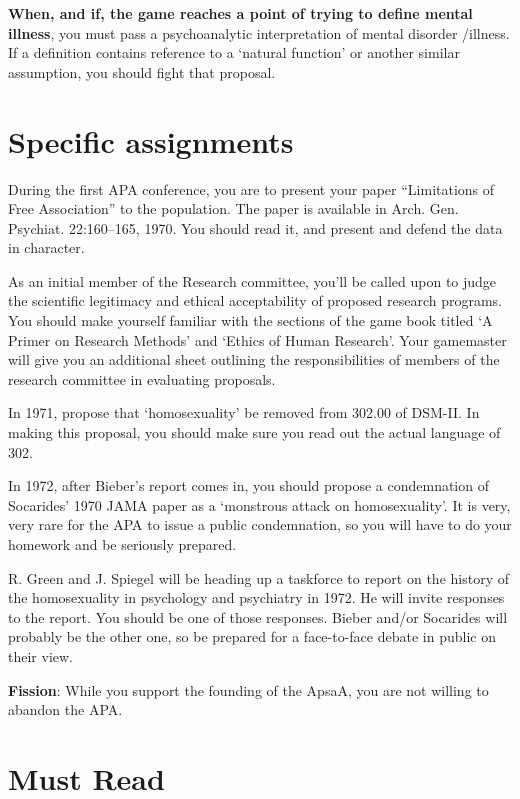 \textbf{When, and if, the game reaches a point of trying to define mental illness}, you must pass a psychoanalytic interpretation of mental disorder \slash  illness. If a definition contains reference to a `natural function' or another similar assumption, you should fight that proposal.

\section{Specific assignments}
\label{specificassignments}

During the first APA conference, you are to present your paper ``Limitations of Free Association'' to the population. The paper is available in Arch. Gen. Psychiat. 22:160--165, 1970. You should read it, and present and defend the data in character.

As an initial member of the Research committee, you'll be called upon to judge the scientific legitimacy and ethical acceptability of proposed research programs. You should make yourself familiar with the sections of the game book titled `A Primer on Research Methods' and `Ethics of Human Research'. Your gamemaster will give you an additional sheet outlining the responsibilities of members of the research committee in evaluating proposals.

In 1971, propose that `homosexuality' be removed from 302.00 of DSM-II. In making this proposal, you should make sure you read out the actual language of 302.

In 1972, after Bieber's report comes in, you should propose a condemnation of Socarides' 1970 JAMA paper as a `monstrous attack on homosexuality'. It is very, very rare for the APA to issue a public condemnation, so you will have to do your homework and be seriously prepared.

R. Green and J. Spiegel will be heading up a taskforce to report on the history of the homosexuality in psychology and psychiatry in 1972. He will invite responses to the report. You should be one of those responses. Bieber and\slash or Socarides will probably be the other one, so be prepared for a face-to-face debate in public on their view.

\textbf{Fission}: While you support the founding of the ApsaA, you are not willing to abandon the APA.

\section{Must Read}
\label{mustread}

